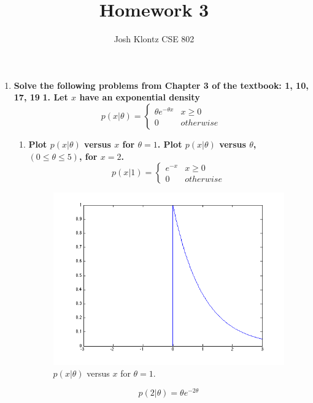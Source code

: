 \documentclass[12pt]{article}
\begin{document}
 
\title{Homework 3}
\author{Josh Klontz
CSE 802}
 
\maketitle

\begin{enumerate}
\item \textbf{Solve the following problems from Chapter 3 of the textbook: 1, 10, 17, 19}
\subitem \textbf{1. Let $x$ have an exponential density}
  \begin{equation}
    p(x|\theta) = \left\{\begin{array}{ll}\theta e^{-\theta x}&x\geq 0\\0&otherwise\end{array}\right.
  \end{equation}
  \begin{enumerate}
  \item \textbf{Plot $p(x|\theta)$ versus $x$ for $\theta = 1$. Plot $p(x|\theta)$ versus $\theta$, $(0 \leq \theta \leq 5)$, for $x=2$.}
    \begin{equation}
      p(x|1) = \left\{\begin{array}{ll} e^{-x}&x\geq 0\\0&otherwise\end{array}\right.
    \end{equation}
    \begin{figure}[H]
      \centering
      \includegraphics[width=4in]{1a1}
      \caption{$p(x|\theta)$ versus $x$ for $\theta = 1$.}
    \end{figure}
  \begin{equation}
    p(2|\theta) = \theta e^{-2\theta}
  \end{equation}
  \begin{figure}[H]

\end{figure}
\end{enumerate}
\end{enumerate}
\end{document}
